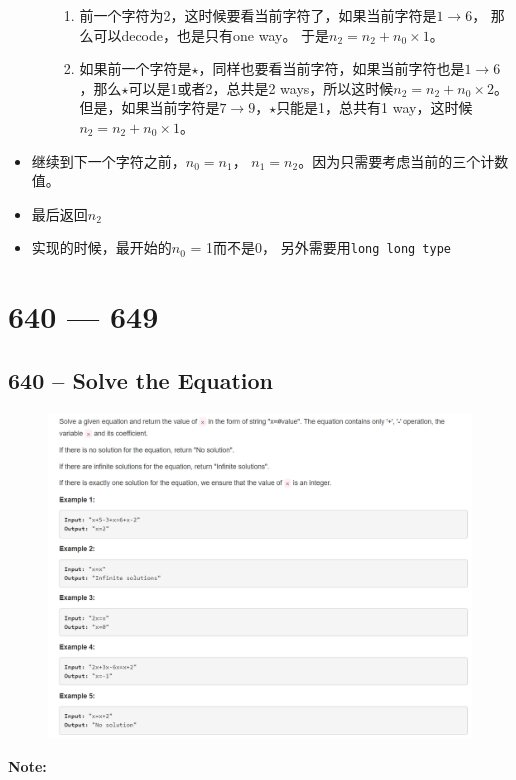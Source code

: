 \documentclass[a4paper,12pt]{article}
\begin{document}
\begin{CJK*}{UTF8}{gbsn}
\begin{itemize}
\begin{enumerate}
\begin{enumerate}
					\item 前一个字符为2，这时候要看当前字符了，如果当前字符是$1 \rightarrow 6$， 那么可以decode，也是只有one way。 于是$n_2 = n_2 + n_0 \times 1$。
					\item 如果前一个字符是$\star$，同样也要看当前字符，如果当前字符也是$1 \rightarrow 6$，那么$\star$可以是1或者2，总共是2 ways，所以这时候$n_2=n_2 + n_0\times 2$。但是，如果当前字符是$ 7 \rightarrow 9$，$\star$只能是1，总共有1 way，这时候$n_2 = n_2 + n_0\times 1$。
				\end{enumerate}
		\end{enumerate}
	\item 继续到下一个字符之前，$n_0=n_1$， $n_1 = n_2$。因为只需要考虑当前的三个计数值。
	\item 最后返回$n_2$
	\item 实现的时候，最开始的$n_0$ = 1而不是0， 另外需要用\texttt{long long type} 
	\end{itemize}
	\clearpage
\end{CJK*}

\section{640 --- 649}	
\subsection{640 -- Solve the Equation}
\begin{figure}[H]
	\begin{center}
		\includegraphics[width=18cm]{640.png}
	\end{center}
\end{figure}
\textbf{\large{Note:}}
\par
\vspace{0.5em}
\end{document}
